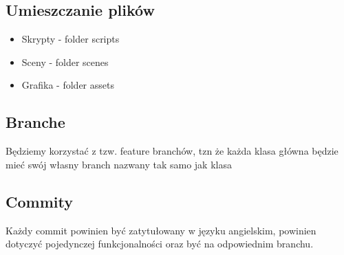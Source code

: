 \documentclass[]{report}
\begin{document}
\subsection{Umieszczanie plików}
\begin{itemize}
	\item Skrypty - folder scripts
	\item Sceny - folder scenes
	\item Grafika - folder assets
	
\end{itemize}
\subsection{Branche}
Będziemy korzystać z tzw. feature branchów, tzn że każda klasa główna będzie mieć swój własny branch nazwany tak samo jak klasa
\subsection{Commity}
Każdy commit powinien być zatytułowany w języku angielskim, powinien dotyczyć pojedynczej funkcjonalności oraz być na odpowiednim branchu. 
\end{document}
